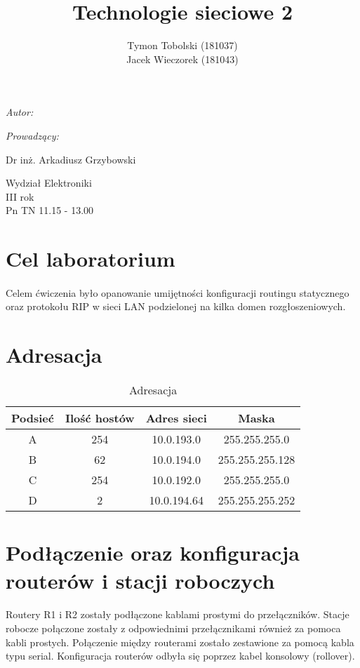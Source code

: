 \documentclass[wide,a4paper,titlepage,12pt] {article}
\title{Technologie sieciowe 2}
\author{Tymon Tobolski (181037)\\ Jacek Wieczorek (181043)}
\makeatletter
\renewcommand{\maketitle}{
\begin{titlepage}
  \begin{center}
    \vspace*{3cm}
    \LARGE \@title \par
    \vspace{2cm}
    \textit{\small Autor:}\par
    \normalsize \@author\par \normalsize
    \vspace{3cm}
    \textit{\small Prowadzący:}\par
    Dr inż. Arkadiusz Grzybowski\par
    \vspace{2cm}
    Wydział Elektroniki\\ III rok\\ Pn TN 11.15 - 13.00\par
    \vspace{4cm}
    \small \@date
  \end{center}
\end{titlepage}
}
\makeatother
\begin{document}
\maketitle
  \section{Cel laboratorium}
  \paragraph{}
  Celem ćwiczenia było opanowanie umijętności konfiguracji routingu statycznego oraz protokołu RIP w sieci LAN podzielonej na kilka domen rozgłoszeniowych.

  \section{Adresacja}

\begin{table}[h]
  \begin{center}
    \begin{tabular}{|c|c|c|c|}
      \hline
      Podsieć & Ilość hostów & Adres sieci & Maska \\
      \hline
      A & 254 & 10.0.193.0  & 255.255.255.0 \\
      B & 62  & 10.0.194.0  & 255.255.255.128 \\
      C & 254 & 10.0.192.0  & 255.255.255.0 \\
      D & 2   & 10.0.194.64 & 255.255.255.252 \\
      \hline
    \end{tabular}
  \end{center}
  \caption{Adresacja}
\end{table}

  \section{Podłączenie oraz konfiguracja routerów i stacji roboczych}
  \paragraph{}
  Routery R1 i R2 zostały podłączone kablami prostymi do przełączników. Stacje robocze połączone zostały z odpowiednimi przełącznikami również za pomoca kabli prostych. Połączenie między routerami zostało zestawione za pomocą kabla typu serial. Konfiguracja routerów odbyła się poprzez kabel konsolowy (rollover).
\end{document}
